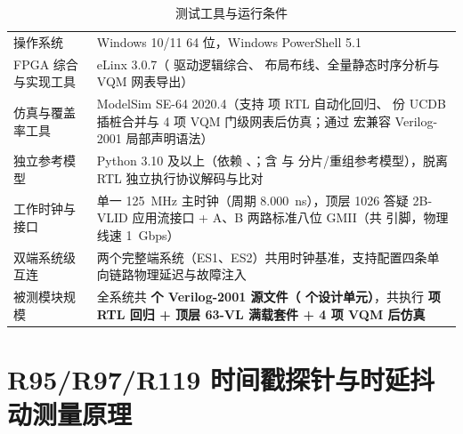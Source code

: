 \begin{table}[H]\centering
\caption{测试工具与运行条件}\label{tab:tools}
\begin{tabularx}{\linewidth}{@{}lL@{}}
\toprule
{} &  \\
\midrule
操作系统 & Windows 10/11 64 位，Windows PowerShell 5.1 \\
FPGA 综合与实现工具 & eLinx 3.0.7（ 驱动逻辑综合、 布局布线、全量静态时序分析与 VQM 网表导出） \\
仿真与覆盖率工具 & ModelSim SE-64 2020.4（支持 \RegCount{} 项 RTL 自动化回归、\CovUcdbCount{} 份 UCDB  插桩合并与 4 项 VQM 门级网表后仿真；通过  宏兼容 Verilog-2001 局部声明语法） \\
独立参考模型 & Python 3.10 及以上（依赖 、；含  与  分片/重组参考模型），脱离 RTL 独立执行协议解码与比对 \\
工作时钟与接口 & 单一 125~MHz 主时钟（周期 8.000~ns），顶层 1026 答疑 2B-VLID 应用流接口 + A、B 两路标准八位 GMII（共 \Pins{} 引脚，物理线速 1~Gbps） \\
双端系统级互连 & 两个完整端系统（ES1、ES2）共用时钟基准，支持配置四条单向链路物理延迟与故障注入 \\
被测模块规模 & 全系统共 \textbf{\RtlFileCount{} 个 Verilog-2001 源文件（\DesignUnitCount{} 个设计单元）}，共执行 \textbf{\RegCount{} 项 RTL 回归 + 顶层 63-VL 满载套件 + 4 项 VQM 后仿真} \\
\bottomrule
\end{tabularx}
\end{table}

\section{R95/R97/R119 时间戳探针与时延抖动测量原理}\label{sec:probe_theory}

